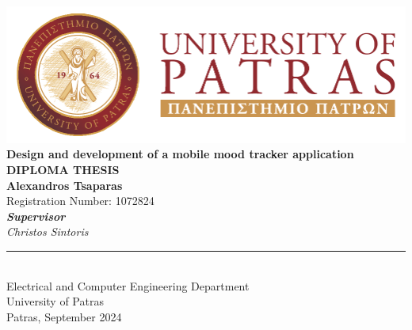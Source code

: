 \thispagestyle{empty}

\begin{titlepage}
    \begin{center}
        \includegraphics[width=0.8\linewidth]{figures/university/logo-english.pdf} \\[5em]

        {\LARGE \textbf{Design and development of a mobile mood tracker application}}\\[10mm]

        {\large \textbf{DIPLOMA THESIS}}\\[5em]

        {\Large \textbf{Alexandros Tsaparas}} \\[1em]
        {\normalsize Registration Number: 1072824} \\[2em] %
        {\large \textbf{\textit{Supervisor}}} \\[0.2em]
        {\large \textit{Christos Sintoris}} \\[2em]

        \rule{0.5\textwidth}{0.4pt} \\[1.5em] %
        {\large Electrical and Computer Engineering Department} \\[0.5em]
        {\large University of Patras}\\[2em]

        {\large Patras, September 2024}
    \end{center}
\end{titlepage}

\thispagestyle{empty}